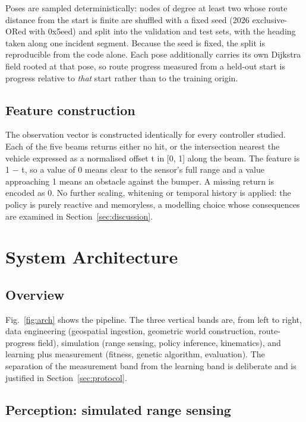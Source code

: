 \documentclass[conference]{IEEEtran}
\begin{document}
Poses are sampled deterministically: nodes of degree at least two whose route distance from the start is finite are shuffled with a fixed seed (2026 exclusive-ORed with 0x5eed) and split into the validation and test sets, with the heading taken along one incident segment. Because the seed is fixed, the split is reproducible from the code alone. Each pose additionally carries its own Dijkstra field rooted at that pose, so route progress measured from a held-out start is progress relative to \emph{that} start rather than to the training origin.

\subsection{Feature construction}

The observation vector is constructed identically for every controller studied. Each of the five beams returns either no hit, or the intersection nearest the vehicle expressed as a normalised offset t in [0, 1] along the beam. The feature is 1 − t, so a value of 0 means clear to the sensor's full range and a value approaching 1 means an obstacle against the bumper. A missing return is encoded as 0. No further scaling, whitening or temporal history is applied: the policy is purely reactive and memoryless, a modelling choice whose consequences are examined in Section~\ref{sec:discussion}.

\section{System Architecture}

\label{sec:system}

\subsection{Overview}

Fig.~\ref{fig:arch} shows the pipeline. The three vertical bands are, from left to right, data engineering (geospatial ingestion, geometric world construction, route-progress field), simulation (range sensing, policy inference, kinematics), and learning plus measurement (fitness, genetic algorithm, evaluation). The separation of the measurement band from the learning band is deliberate and is justified in Section~\ref{sec:protocol}.

\subsection{Perception: simulated range sensing}
\end{document}
